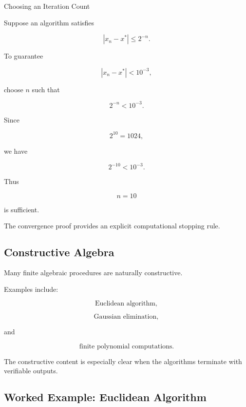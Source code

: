 \begin{workedexamplebox}{Choosing an Iteration Count}

Suppose an algorithm satisfies

\[
|x_n-x^*|
\leq
2^{-n}.
\]

To guarantee

\[
|x_n-x^*|
<
10^{-3},
\]

choose \(n\) such that

\[
2^{-n}
<
10^{-3}.
\]

Since

\[
2^{10}=1024,
\]

we have

\[
2^{-10}
<
10^{-3}.
\]

Thus

\begin{answerbox}
\[
\boxed{
n=10
}
\]

is sufficient.
\end{answerbox}

The convergence proof provides an explicit computational stopping rule.

\end{workedexamplebox}

\subsection{Constructive Algebra}
\label{subsec:constructive-algebra}

Many finite algebraic procedures are naturally constructive.

Examples include:

\[
\boxed{
\text{Euclidean algorithm},
}
\]

\[
\boxed{
\text{Gaussian elimination},
}
\]

and

\[
\boxed{
\text{finite polynomial computations}.
}
\]

The constructive content is especially clear when the algorithms terminate
with verifiable outputs.

\subsection{Worked Example: Euclidean Algorithm}
\label{subsec:worked-euclidean-algorithm-constructive}

